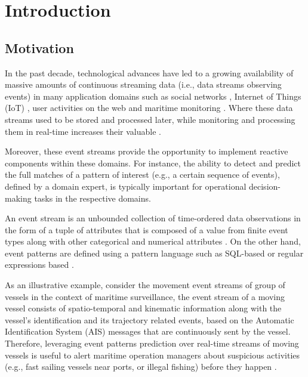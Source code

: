 \chapter{Introduction}


\section{Motivation}
\par In the past decade, technological advances have led to a growing availability of massive amounts of continuous streaming data (i.e., data streams observing events) in many application domains such as social networks \cite{reuter2012event,mathioudakis2010twittermonitor}, Internet of Things (IoT) \cite{miorandi2012internet}, user activities on the web \cite{banerjee2001clickstream,metwally2005duplicate} and maritime monitoring \cite{patroumpas2015event,laxhammar2010conformal}. Where these data streams  used to be stored and processed later, while monitoring and processing them in real-time increases their valuable \cite{carney2002monitoring}.

 Moreover, these event streams provide the opportunity to implement reactive components within these domains.  For instance, the ability to detect and predict the full matches of a pattern of interest (e.g., a certain sequence of events), defined by a domain expert, is typically important for operational decision-making tasks in the respective domains.

\par An event stream is an unbounded collection of time-ordered data observations in the form of a tuple of attributes that is composed of a value from finite event types along with other categorical and numerical attributes \cite{agrawal2008efficient,schultz2009distributed,zhou_pattern_2015,flouris2017issues}.  On the other hand, event patterns are defined using a pattern language such as SQL-based \cite{schultz2009distributed} or regular expressions based \cite{alevizos2017event}.

\par As an illustrative example, consider the movement event streams of group of vessels in the context of maritime surveillance, the event stream of a moving vessel consists of spatio-temporal and kinematic information along with the vessel's identification and its trajectory related events, based on the Automatic Identification System (AIS) \cite{ais} messages that are continuously sent by the vessel. Therefore, leveraging event patterns prediction over real-time streams of moving vessels is useful to alert maritime operation managers about suspicious activities (e.g., fast sailing vessels near ports, or illegal fishing) before they happen \cite{patroumpas2015event}. 

